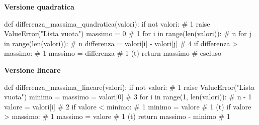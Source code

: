 \noindent\hspace*{2mm}%
\begin{minipage}[t]{\dimexpr\linewidth/2-4mm\relax}
\vspace{0pt}
\textbf{Versione quadratica}
\begin{unipdcode}[language=Python,
  basicstyle=\ttfamily\scriptsize,
  numbers=none,
  xleftmargin=0pt,
  xrightmargin=0pt,
  framexleftmargin=0.3em]
def differenza_massima_quadratica(valori):
    if not valori:                              # 1
        raise ValueError("Lista vuota")
    massimo = 0                                 # 1
    for i in range(len(valori)):                # n
        for j in range(len(valori)):            # n
            differenza = valori[i] - valori[j]  # 4
            if differenza > massimo:            # 1
                massimo = differenza            # 1 (t)
    return massimo                              # escluso
\end{unipdcode}
\end{minipage}%
\hspace*{4mm}%
\begin{minipage}[t]{\dimexpr\linewidth/2-4mm\relax}
\vspace{0pt}
\textbf{Versione lineare}
\begin{unipdcode}[language=Python,
  basicstyle=\ttfamily\scriptsize,
  numbers=none,
  xleftmargin=0pt,
  xrightmargin=0pt,
  framexleftmargin=0.3em]
def differenza_massima_lineare(valori):
    if not valori:                       # 1
        raise ValueError("Lista vuota")
    minimo = massimo = valori[0]         # 3
    for i in range(1, len(valori)):      # n - 1
        valore = valori[i]               # 2
        if valore < minimo:              # 1
            minimo = valore              # 1 (t)
        if valore > massimo:             # 1
            massimo = valore             # 1 (t)
    return massimo - minimo              # 1
\end{unipdcode}
\end{minipage}
